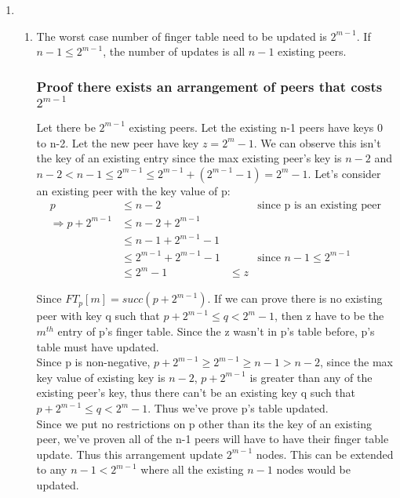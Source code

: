 \documentclass[12pt]{article}
\begin{document}
\begin{enumerate}
	\item 
	\begin{enumerate}
	\item
	    The worst case number of finger table need to be updated is $2^{m-1}$. If $n-1 \le 2^{m-1}$, the number of updates is all $n-1$ existing peers.


    \subsubsection*{Proof there exists an arrangement of peers that costs $2^{m-1}$}
    Let there be $2^{m-1}$ existing peers. Let the existing n-1 peers have keys 0 to n-2. 
    Let the new peer have key $z=2^m-1$.  We can observe this isn't the key of an existing 
    entry since the max existing peer's key is $n-2$ and $n-2 < n-1 \le 2^{m-1} \le 2^{m-1} + (2^{m-1}-1) = 2^m-1$.
    Let's consider an existing peer with the key value of p:
    \begin{align*}
        p &\le n-2 &&\text{since p is an existing peer}\\
        \Rightarrow p + 2^{m-1} &\le n-2 + 2^{m-1} \\
            &\le n-1 + 2^{m-1} - 1 \\
            &\le 2^{m-1} + 2^{m-1} -1 &&\text{since $n-1\le 2^{m-1}$} \\
            &\le 2^m - 1
            &\le z
    \end{align*}

    Since $FT_p[m] = succ(p+2^{m-1})$. If we can prove there is no existing peer with key q such that
    $p + 2^{m-1} \le q < 2^m-1$, then z have to be the $m^{th}$ entry of p's finger table. 
    Since the z wasn't in p's table before, p's table must have updated. \\

    Since p is non-negative, $p + 2^{m-1} \ge 2^{m-1} \ge n-1 > n-2$, since the max key value of existing
    key is $n-2$, $p+2^{m-1}$ is greater than any of the existing peer's key, thus there can't be an existing key
    q such that $p + 2^{m-1} \le q < 2^m-1$. Thus we've prove p's table updated. \\

    Since we put no restrictions on p other than its the key of an existing peer,
    we've proven all of the n-1 peers will have to have their finger table update. 
    Thus this arrangement update $2^{m-1}$ nodes. This can be extended to any $n-1 < 2^{m-1}$ where all the existing $n-1$ nodes would be updated.



\end{enumerate}
\end{enumerate}
\end{document}
